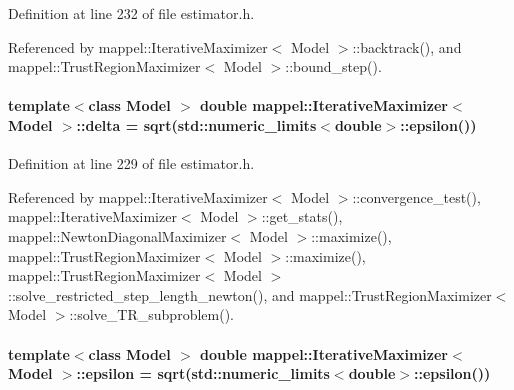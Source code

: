 Definition at line 232 of file estimator.\+h.



Referenced by mappel\+::\+Iterative\+Maximizer$<$ Model $>$\+::backtrack(), and mappel\+::\+Trust\+Region\+Maximizer$<$ Model $>$\+::bound\+\_\+step().

\paragraph[{\texorpdfstring{delta}{delta}}]{\setlength{\rightskip}{0pt plus 5cm}template$<$class Model $>$ double {\bf mappel\+::\+Iterative\+Maximizer}$<$ Model $>$\+::delta = sqrt(std\+::numeric\+\_\+limits$<$double$>$\+::{\bf epsilon}())\hspace{0.3cm}{\ttfamily [protected]}}\hypertarget{classmappel_1_1IterativeMaximizer_a0aab5231009711a55325adbeb7d5f282}{}\label{classmappel_1_1IterativeMaximizer_a0aab5231009711a55325adbeb7d5f282}


Definition at line 229 of file estimator.\+h.



Referenced by mappel\+::\+Iterative\+Maximizer$<$ Model $>$\+::convergence\+\_\+test(), mappel\+::\+Iterative\+Maximizer$<$ Model $>$\+::get\+\_\+stats(), mappel\+::\+Newton\+Diagonal\+Maximizer$<$ Model $>$\+::maximize(), mappel\+::\+Trust\+Region\+Maximizer$<$ Model $>$\+::maximize(), mappel\+::\+Trust\+Region\+Maximizer$<$ Model $>$\+::solve\+\_\+restricted\+\_\+step\+\_\+length\+\_\+newton(), and mappel\+::\+Trust\+Region\+Maximizer$<$ Model $>$\+::solve\+\_\+\+T\+R\+\_\+subproblem().

\paragraph[{\texorpdfstring{epsilon}{epsilon}}]{\setlength{\rightskip}{0pt plus 5cm}template$<$class Model $>$ double {\bf mappel\+::\+Iterative\+Maximizer}$<$ Model $>$\+::epsilon = sqrt(std\+::numeric\+\_\+limits$<$double$>$\+::epsilon())\hspace{0.3cm}{\ttfamily [protected]}}\hypertarget{classmappel_1_1IterativeMaximizer_ae727ea0e3cab3924d21ebe9c12fec314}{}\label{classmappel_1_1IterativeMaximizer_ae727ea0e3cab3924d21ebe9c12fec314}


